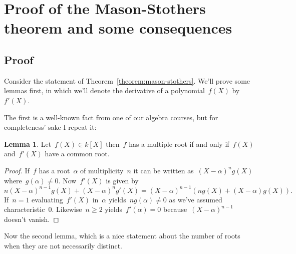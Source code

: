 \documentclass[11pt, a4paper, openany, oneside, article]{memoir}
\theoremstyle{definition}
\newtheorem{lemma}[theorem]{Lemma}
\begin{document}
\clearpage


\section{Proof of the Mason-Stothers theorem and some consequences}
\label{section:proof-and-consequences}

\subsection{Proof}

Consider the statement of Theorem~\ref{theorem:mason-stothers}. We'll prove some lemmas first, in which we'll denote the derivative of a polynomial~$f(X)$ by $f'(X)$.

The first is a well-known fact from one of our algebra courses, but for completeness' sake I repeat it:

\begin{lemma}
  Let~$f(X)\in k[X]$ then~$f$ has a multiple root if and only if~$f(X)$ and~$f'(X)$ have a common root.

  \begin{proof}
    If~$f$ has a root~$\alpha$ of multiplicity~$n$ it can be written as~$(X-\alpha)^ng(X)$ where~$g(\alpha)\neq 0$. Now~$f'(X)$ is given by
    \begin{equation}
      n(X-\alpha)^{n-1}g(X)+(X-\alpha)^ng'(X)=(X-\alpha)^{n-1}\left( ng(X)+(X-\alpha)g(X) \right).
    \end{equation}
    If~$n=1$ evaluating~$f'(X)$ in~$\alpha$ yields~$ng(\alpha)\neq 0$ as we've assumed characteristic~$0$. Likewise~$n\geq 2$ yields~$f'(\alpha)=0$ because~$(X-\alpha)^{n-1}$ doesn't vanish.
  \end{proof}
\end{lemma}

Now the second lemma, which is a nice statement about the number of roots when they are not necessarily distinct.
\end{document}
